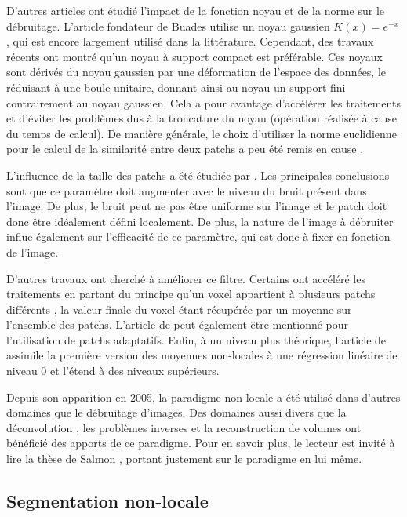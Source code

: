 D'autres articles ont étudié l'impact de la fonction noyau et de la norme sur le débruitage. 
L'article fondateur de Buades \cite{Buades:MMS:2005} utilise un noyau gaussien $K(x) = e^{-x}$, qui est encore largement utilisé dans la littérature.
Cependant, des travaux récents \cite{Goossens:LNLA:2008, Salmon:2010} ont montré qu'un noyau à support compact \cite{Remaki:TIP:2000} est préférable.
Ces noyaux sont dérivés du noyau gaussien par une déformation de l'espace des données, le réduisant à une boule unitaire, donnant ainsi au noyau un support fini contrairement au noyau gaussien.
Cela a pour avantage d'accélérer les traitements et d'éviter les problèmes dus à la troncature du noyau (opération réalisée à cause du temps de calcul).
De manière générale, le choix d'utiliser la norme euclidienne pour le calcul de la similarité entre deux patchs a peu été remis en cause \cite{Salmon:2010}.

L'influence de la taille des patchs a été étudiée par \cite{Mairal:ECCV:2009}. 
Les principales conclusions sont que ce paramètre doit augmenter avec le niveau du bruit présent dans l'image.
De plus, le bruit peut ne pas être uniforme sur l'image et le patch doit donc être idéalement défini localement.
De plus, la nature de l'image à débruiter influe également sur l'efficacité de ce paramètre, qui est donc à fixer en fonction de l'image.

D'autres travaux ont cherché à améliorer ce filtre. 
Certains ont accéléré les traitements en partant du principe qu'un voxel appartient à plusieurs patchs différents \cite{Coupe:TMI:2008}, la valeur finale du voxel étant récupérée par un moyenne sur l'ensemble des patchs.
L'article de \cite{Kervrann:IJCV:2008} peut également être mentionné pour l'utilisation de patchs adaptatifs.
Enfin, à un niveau plus théorique, l'article de \cite{Katkovnik:IJCV:2010} assimile la première version des moyennes non-locales à une régression linéaire de niveau $0$ et l'étend à des niveaux supérieurs.

Depuis son apparition en 2005, la paradigme non-locale a été utilisé dans d'autres domaines que le débruitage d'images.
Des domaines aussi divers que la déconvolution \cite{Mignotte:PRL:2008}, les problèmes inverses \cite{Bougleux:ECCV:2008} et la reconstruction de volumes \cite{Rousseau:MIA:2010} ont bénéficié des apports de ce paradigme.
Pour en savoir plus, le lecteur est invité à lire la thèse de Salmon \cite{Salmon:2010}, portant justement sur le paradigme en lui même.

\subsection{Segmentation non-locale}

